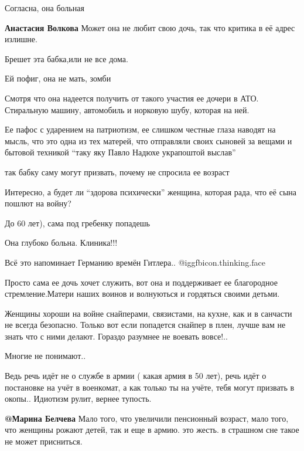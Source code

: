 \begin{itemize} %

Согласна, она больная

\textbf{Анастасия Волкова} Может она не любит свою дочь, так что критика в её адрес излишне.

Брешет эта бабка,или не все дома.

Ей пофиг, она не мать, зомби


Смотря что она надеется получить от такого участия ее дочери в АТО. Стиральную
машину, автомобиль и норковую шубу, которая на ней. 

Ее пафос с ударением на патриотизм, ее слишком честные глаза наводят на мысль,
что это одна из тех матерей, что отправляли своих сыновей за вещами и бытовой
техникой \enquote{таку яку Павло Надюхе украпоштой выслав} 

так бабку саму могут призвать, почему не спросила ее возраст

Интересно, а будет ли \enquote{здорова психически} женщина, которая рада, что её сына пошлют на войну?

До 60 лет), сама под гребенку попадешь

Она глубоко больна. Клиника!!!

Всё это напоминает Германию  времён Гитлера.. @igg{fbicon.thinking.face}  


Просто сама ее дочь хочет служить, вот она и поддерживает ее благородное
стремление.Матери наших воинов и волнуються  и гордяться своими детьми.


Женщины хороши на войне снайперами, связистами, на кухне, как и в санчасти не
всегда безопасно. Только вот если попадется снайпер в плен, лучше вам не знать
что с ними делают. Гораздо разумнее не воевать вовсе!..


Многие не понимают..

Ведь речь идёт не о службе в армии ( какая армия в 50 лет), речь идёт о
постановке на учёт в военкомат, а как только ты на учёте, тебя могут призвать в
окопы.. Идиотизм рулит, вернее тупость.

\textbf{@Марина Белчева}  Мало того, что увеличили пенсионный возраст, мало того, что
женщины рожают детей, так и еще в армию. это жесть. в страшном сне такое не
может присниться. 


\end{itemize}
